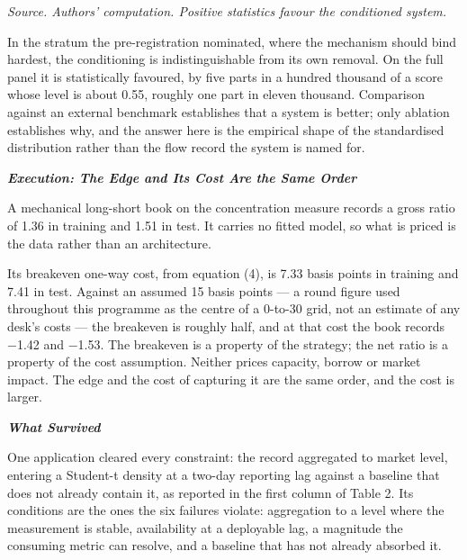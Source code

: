 \documentclass[12pt,a4paper]{article}
\newcommand{\subhead}[1]{%
  \par\vspace{6pt}\noindent\textbf{\textit{#1}}\par\vspace{1pt}}
\begin{document}
{\footnotesize\textit{Source. Authors' computation. Positive statistics favour the conditioned system.}}

In the stratum the pre-registration nominated, where the mechanism should bind hardest, the conditioning is indistinguishable from its own removal. On the full panel it is statistically favoured, by five parts in a hundred thousand of a score whose level is about 0.55, roughly one part in eleven thousand. Comparison against an external benchmark establishes that a system is better; only ablation establishes why, and the answer here is the empirical shape of the standardised distribution rather than the flow record the system is named for.

\subhead{Execution: The Edge and Its Cost Are the Same Order}

A mechanical long-short book on the concentration measure records a gross ratio of 1.36 in training and 1.51 in test. It carries no fitted model, so what is priced is the data rather than an architecture.

Its breakeven one-way cost, from equation (4), is 7.33 basis points in training and 7.41 in test. Against an assumed 15 basis points — a round figure used throughout this programme as the centre of a 0-to-30 grid, not an estimate of any desk's costs — the breakeven is roughly half, and at that cost the book records −1.42 and −1.53. The breakeven is a property of the strategy; the net ratio is a property of the cost assumption. Neither prices capacity, borrow or market impact. The edge and the cost of capturing it are the same order, and the cost is larger.

\subhead{What Survived}

One application cleared every constraint: the record aggregated to market level, entering a Student-t density at a two-day reporting lag against a baseline that does not already contain it, as reported in the first column of Table 2. Its conditions are the ones the six failures violate: aggregation to a level where the measurement is stable, availability at a deployable lag, a magnitude the consuming metric can resolve, and a baseline that has not already absorbed it.
\end{document}

